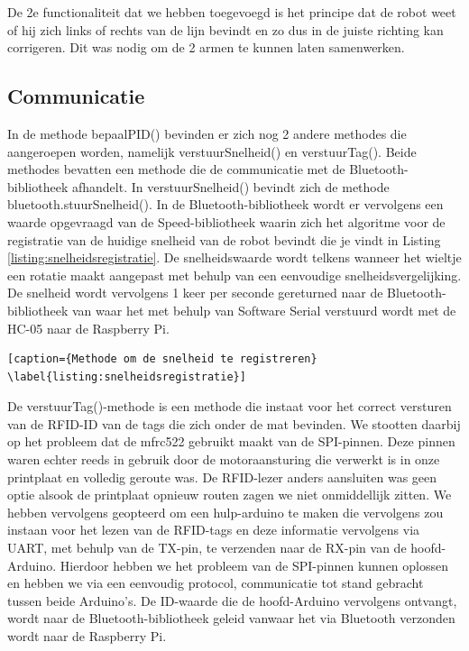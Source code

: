 De 2e functionaliteit dat we hebben toegevoegd is het principe dat de robot weet of hij zich links of rechts van de lijn bevindt en zo dus in de juiste richting kan corrigeren. Dit was nodig om de 2 armen te kunnen laten samenwerken.


\subsection {Communicatie}

In de methode bepaalPID() bevinden er zich nog 2 andere methodes die aangeroepen worden, namelijk verstuurSnelheid() en verstuurTag(). Beide methodes bevatten een methode die de communicatie met de Bluetooth-bibliotheek afhandelt. In verstuurSnelheid() bevindt zich de methode bluetooth.stuurSnelheid(). In de Bluetooth-bibliotheek wordt er vervolgens een waarde opgevraagd van de Speed-bibliotheek waarin zich het algoritme voor de registratie van de huidige snelheid van de robot bevindt die je vindt in Listing \ref{listing:snelheidsregistratie}. De snelheidswaarde wordt telkens wanneer het wieltje een rotatie maakt aangepast met behulp van een eenvoudige snelheidsvergelijking. De snelheid wordt vervolgens 1 keer per seconde gereturned naar de Bluetooth-bibliotheek van waar het met behulp van Software Serial verstuurd wordt met de HC-05 naar de Raspberry Pi. 


\begin{lstlisting}[caption={Methode om de snelheid te registreren} \label{listing:snelheidsregistratie}]
\end{lstlisting}

De verstuurTag()-methode is een methode die instaat voor het correct versturen van de RFID-ID van de tags die zich onder de mat bevinden. We stootten daarbij op het probleem dat de mfrc522 gebruikt maakt van de SPI-pinnen. Deze pinnen waren echter reeds in gebruik door de motoraansturing die verwerkt is in onze printplaat en volledig geroute was. De RFID-lezer anders aansluiten was geen optie alsook de printplaat opnieuw routen zagen we niet onmiddellijk zitten. We hebben vervolgens geopteerd om een hulp-arduino te maken die vervolgens zou instaan voor het lezen van de RFID-tags en deze informatie vervolgens via UART, met behulp van de TX-pin, te verzenden naar de RX-pin van de hoofd-Arduino. Hierdoor hebben we het probleem van de SPI-pinnen kunnen oplossen en hebben we via een eenvoudig protocol, communicatie tot stand gebracht tussen beide Arduino's. De ID-waarde die de hoofd-Arduino vervolgens ontvangt, wordt naar de Bluetooth-bibliotheek geleid vanwaar het via Bluetooth verzonden wordt naar de Raspberry Pi.

